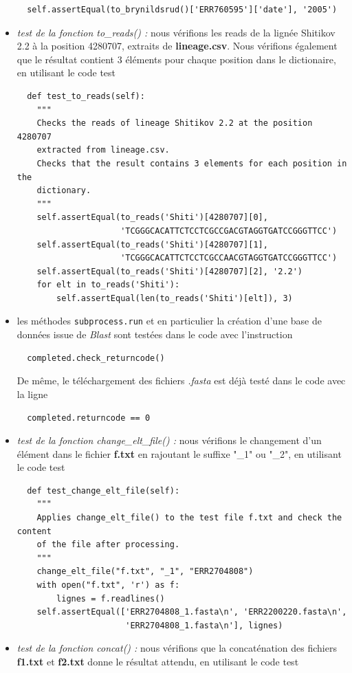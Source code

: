 \documentclass[twoside,a4paper,11pt,frenchb,openany]{report}
\begin{document}
\begin{itemize}
\begin{verbatim}
  self.assertEqual(to_brynildsrud()['ERR760595']['date'], '2005')
\end{verbatim}
\item \textit{test de la fonction to\_reads() :} nous vérifions les reads de la lignée Shitikov 2.2 à la position 4280707, extraits de \textbf{lineage.csv}. Nous vérifions également que le résultat contient 3 éléments pour chaque position dans le dictionaire, en utilisant le code test
\begin{verbatim}
  def test_to_reads(self):
    """
    Checks the reads of lineage Shitikov 2.2 at the position 4280707
    extracted from lineage.csv.
    Checks that the result contains 3 elements for each position in the
    dictionary.
    """
    self.assertEqual(to_reads('Shiti')[4280707][0],
                     'TCGGGCACATTCTCCTCGCCGACGTAGGTGATCCGGGTTCC')
    self.assertEqual(to_reads('Shiti')[4280707][1],
                     'TCGGGCACATTCTCCTCGCCAACGTAGGTGATCCGGGTTCC')
    self.assertEqual(to_reads('Shiti')[4280707][2], '2.2')
    for elt in to_reads('Shiti'):
        self.assertEqual(len(to_reads('Shiti')[elt]), 3)
\end{verbatim}
\item les méthodes \texttt{subprocess.run} et en particulier la création d'une base de données issue de \textit{Blast} sont testées dans le code avec l'instruction 
\begin{verbatim}
  completed.check_returncode()
\end{verbatim}
De même, le téléchargement des fichiers \textit{.fasta} est déjà testé dans le code avec la ligne 
\begin{verbatim}  
  completed.returncode == 0
\end{verbatim}
\item \textit{test de la fonction change\_elt\_file() :} nous vérifions le changement d'un élément dans le fichier \textbf{f.txt} en rajoutant le suffixe "\_1" ou "\_2", en utilisant le code test
\begin{verbatim}
  def test_change_elt_file(self):
    """
    Applies change_elt_file() to the test file f.txt and check the content
    of the file after processing.
    """
    change_elt_file("f.txt", "_1", "ERR2704808")
    with open("f.txt", 'r') as f:
        lignes = f.readlines()
    self.assertEqual(['ERR2704808_1.fasta\n', 'ERR2200220.fasta\n',
                      'ERR2704808_1.fasta\n'], lignes)
\end{verbatim}
\item \textit{test de la fonction concat() :} nous vérifions que la concaténation des fichiers \textbf{f1.txt} et \textbf{f2.txt} donne le résultat attendu, en utilisant le code test

\end{itemize}
\end{document}
